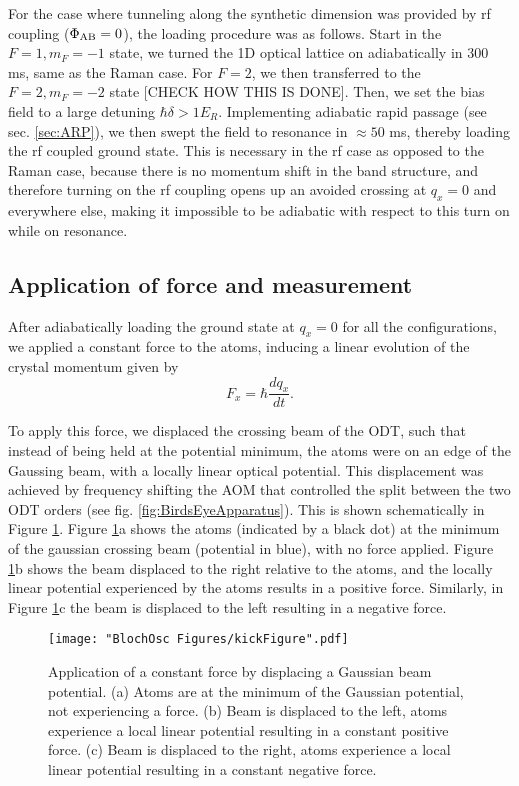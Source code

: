 For the case where tunneling along the synthetic dimension was provided by rf coupling ($\Phi_{\rm AB}=0$), the loading procedure was as follows. Start in the $F=1,m_F=-1$ state, we turned the 1D optical lattice on adiabatically in $300$ ms, same as the Raman case. For $F=2$, we then transferred to the $F=2,m_F=-2$ state [CHECK HOW THIS IS DONE]. Then, we set the bias field to a large detuning $\hbar\delta>1 E_R$. Implementing adiabatic rapid passage (see sec. \ref{sec:ARP}), we then swept the field to resonance in $\approx 50$ ms, thereby loading the rf coupled ground state. This is necessary in the rf case as opposed to the Raman case, because there is no momentum shift in the band structure, and therefore turning on the rf coupling opens up an avoided crossing at $q_x=0$ and everywhere else, making it impossible to be adiabatic with respect to this turn on while on resonance. 

\subsection{Application of force and measurement}\label{sec:forceAndMeasure}
After adiabatically loading the ground state at $q_x=0$ for all the configurations, we applied a constant force to the atoms, inducing a linear evolution of the crystal momentum given by
\begin{equation}
F_x=\hbar\frac{dq_x}{dt}.
\end{equation} 	

To apply this force, we displaced the crossing beam of the ODT, such that instead of being held at the potential minimum, the atoms were on an edge of the Gaussing beam, with a locally linear optical potential. This displacement was achieved by frequency shifting the AOM that controlled the split between the two ODT orders (see fig. \ref{fig:BirdsEyeApparatus}). This is shown schematically in Figure \ref{fig:kickFigure}. Figure \ref{fig:kickFigure}a shows the atoms (indicated by a black dot) at the minimum of the gaussian crossing beam (potential in blue), with no force applied. Figure \ref{fig:kickFigure}b shows the beam displaced to the right relative to the atoms, and the locally linear potential experienced by the atoms results in a positive force. Similarly, in Figure \ref{fig:kickFigure}c the beam is displaced to the left resulting in a negative force. 

\begin{figure}
\texttt{[image: "BlochOsc Figures/kickFigure".pdf]}
\caption[Application of a constant force by displacing a Gaussian beam potential]{Application of a constant force by displacing a Gaussian beam potential. (a) Atoms are at the minimum of the Gaussian potential, not experiencing a force. (b) Beam is displaced to the left, atoms experience a local linear potential resulting in a constant positive force. (c) Beam is displaced to the right, atoms experience a local linear potential resulting in a constant negative force.  }
\label{fig:kickFigure}
\end{figure}

